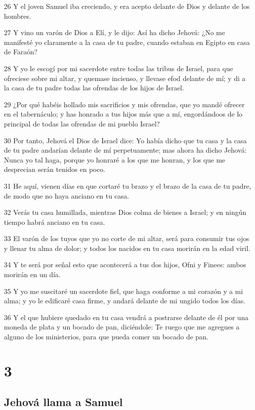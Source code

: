 \par 26 Y el joven Samuel iba creciendo, y era acepto delante de Dios y delante de los hombres.
\par 27 Y vino un varón de Dios a Elí, y le dijo: Así ha dicho Jehová: ¿No me manifesté yo claramente a la casa de tu padre, cuando estaban en Egipto en casa de Faraón?
\par 28 Y yo le escogí por mi sacerdote entre todas las tribus de Israel, para que ofreciese sobre mi altar, y quemase incienso, y llevase efod delante de mí; y di a la casa de tu padre todas las ofrendas de los hijos de Israel. 
\par 29 ¿Por qué habéis hollado mis sacrificios y mis ofrendas, que yo mandé ofrecer en el tabernáculo; y has honrado a tus hijos más que a mí, engordándoos de lo principal de todas las ofrendas de mi pueblo Israel?
\par 30 Por tanto, Jehová el Dios de Israel dice: Yo había dicho que tu casa y la casa de tu padre andarían delante de mí perpetuamente; mas ahora ha dicho Jehová: Nunca yo tal haga, porque yo honraré a los que me honran, y los que me desprecian serán tenidos en poco.
\par 31 He aquí, vienen días en que cortaré tu brazo y el brazo de la casa de tu padre, de modo que no haya anciano en tu casa.
\par 32 Verás tu casa humillada, mientras Dios colma de bienes a Israel; y en ningún tiempo habrá anciano en tu casa.
\par 33 El varón de los tuyos que yo no corte de mi altar, será para consumir tus ojos y llenar tu alma de dolor; y todos los nacidos en tu casa morirán en la edad viril.
\par 34 Y te será por señal esto que acontecerá a tus dos hijos, Ofni y Finees: ambos morirán en un día.
\par 35 Y yo me suscitaré un sacerdote fiel, que haga conforme a mi corazón y a mi alma; y yo le edificaré casa firme, y andará delante de mi ungido todos los días.
\par 36 Y el que hubiere quedado en tu casa vendrá a postrarse delante de él por una moneda de plata y un bocado de pan, diciéndole: Te ruego que me agregues a alguno de los ministerios, para que pueda comer un bocado de pan.

\chapter{3}

\section*{Jehová llama a Samuel}

